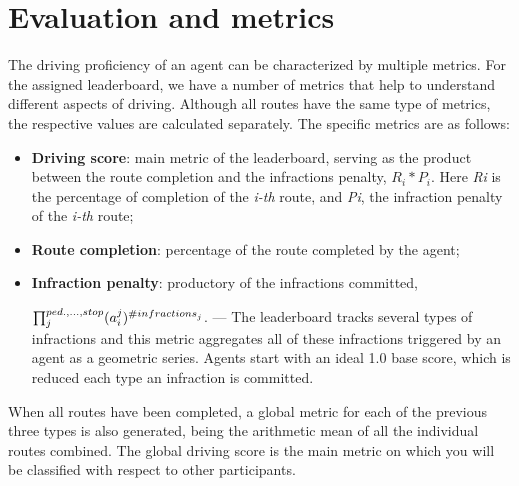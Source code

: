 \documentclass{article}
\begin{document}
\section{Evaluation and metrics}
The driving proficiency of an agent can be characterized by multiple metrics. For the assigned leaderboard, we have a number of metrics that help
to understand different aspects of driving. Although all routes have the same type of metrics, the respective values are calculated separately.
The specific metrics are as follows:
\begin{itemize}
  \item \textbf{Driving score}: main metric of the leaderboard, serving as the product between the route completion and the infractions penalty, $R_i * P_i$.
  Here \textit{Ri} is the percentage of completion of the \textit{i-th} route, and \textit{Pi},
  the infraction penalty of the \textit{i-th} route;
  \item \textbf{Route completion}: percentage of the route completed by the agent;
  \item \textbf{Infraction penalty}: productory of the infractions committed,


  $\prod_{j}^{ped., ..., stop} (a_{\small{i}}^{\small{j}})^{\small{\#infractions}_j}$. —
  The leaderboard tracks several types of infractions and this metric aggregates all of these infractions triggered by an agent as a geometric series. Agents start with an ideal 1.0
  base score, which is reduced each type an infraction is committed.
\end{itemize}
When all routes have been completed, a global metric for each of the previous three types is also generated, being the arithmetic mean of all the individual routes combined.
The global driving score is the main metric on which you will be classified with respect to other participants.
\end{document}
